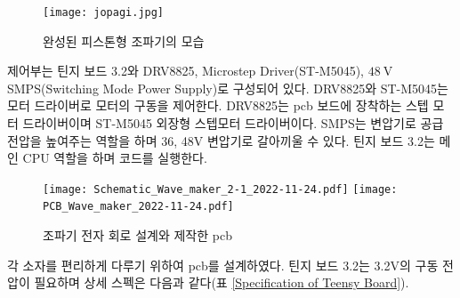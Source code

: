 \begin{figure}[H]
	\begin{center}
		\texttt{[image: jopagi.jpg]}
		\caption{완성된 피스톤형 조파기의 모습}
		\label{Wavetank}
	\end{center}
\end{figure}

제어부는 틴지 보드 3.2와 DRV8825, Microstep Driver(ST-M5045), $48\mathrm{~V}$ SMPS(Switching Mode Power Supply)로 구성되어 있다. DRV8825와 ST-M5045는 모터 드라이버로 모터의 구동을 제어한다. DRV8825는 pcb 보드에 장착하는 스텝 모터 드라이버이며 ST-M5045 외장형 스텝모터 드라이버이다. SMPS는 변압기로 공급 전압을 높여주는 역할을 하며 36, 48V 변압기로 갈아끼울 수 있다. 틴지 보드 3.2는 메인 CPU 역할을 하며 코드를 실행한다.

\begin{figure}[H]
	\begin{center}
		\texttt{[image: Schematic\_Wave\_maker\_2-1\_2022-11-24.pdf]}
		\texttt{[image: PCB\_Wave\_maker\_2022-11-24.pdf]}
        \caption{조파기 전자 회로 설계와 제작한 pcb}
		\label{PCB}
	\end{center}
\end{figure}

각 소자를 편리하게 다루기 위하여 pcb를 설계하였다. 틴지 보드 3.2는 3.2$\mathrm{V}$의 구동 전압이 필요하며 상세 스펙은 다음과 같다(표 \ref{Specification of Teensy Board}).

